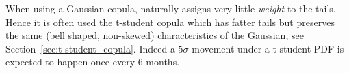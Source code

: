 When using a Gaussian copula, naturally assigns very little \emph{weight} to the tails. Hence it is often used the t-student copula  
which has fatter tails but preserves the same (bell shaped, non-skewed) characteristics of the Gaussian, see Section~\ref{sec:t-student_copula}.
Indeed a $5\sigma$ movement under a t-student PDF is expected to happen once every 6 months. 







